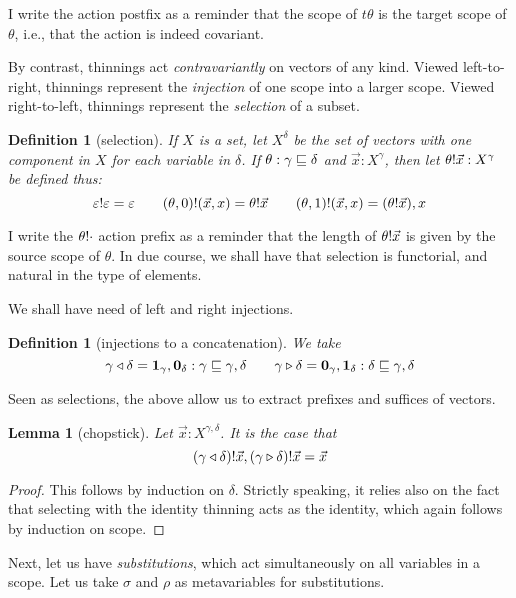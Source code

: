 \documentclass{jfp1}
\newtheorem{lemma}[theorem]{Lemma}
\newtheorem{definition}[theorem]{Definition}
\newcommand{\emp}{\varepsilon}
\begin{document}
I write the action postfix as a reminder that the scope of $t\theta$
is the target scope of $\theta$, i.e., that the action is indeed covariant.

By contrast, thinnings act \emph{contravariantly} on vectors of any kind.
Viewed left-to-right, thinnings represent the \emph{injection} of one scope
into a larger scope. Viewed right-to-left, thinnings represent the
\emph{selection} of a subset.

\begin{definition}[selection]
  If $X$ is a set, let $X^\delta$ be the set of vectors with one
  component in $X$ for each variable in $\delta$. If
  $\theta:\gamma\sqsubseteq\delta$ and $\vec x:X^\gamma$,
  then let $\theta!\vec x : X^\gamma$ be defined thus:
  \[
    \sel\emp\emp=\emp \qquad
    \sel{(\theta,0)}{(\vec x,x)} = \sel\theta{\vec x} \qquad
    \sel{(\theta,1)}{(\vec x,x)} = (\sel\theta{\vec x}),x
  \]
\end{definition}

I write the $\theta!\cdot$ action prefix as a reminder that the
length of $\theta!\vec x$ is given by the source scope
of $\theta$. In due course, we shall have that selection is
functorial, and natural in the type of elements.

We shall have need of left and right injections.
\newcommand{\thinl}[2]{#1 \triangleleft #2}
\newcommand{\thinr}[2]{#1 \triangleright #2}
\begin{definition}[injections to a concatenation]
  We take
  \[
    \thinl\gamma\delta = \ith_\gamma,\eth_\delta :
    \gamma\thin\gamma,\delta \qquad
    \thinr\gamma\delta = \eth_\gamma,\ith_\delta :
    \delta\thin\gamma,\delta
    \]
\end{definition}

Seen as selections, the above allow us to extract prefixes and
suffices of vectors.
\begin{lemma}[chopstick]
  Let $\vec x : X^{\gamma,\delta}$. It is the case that
\[
  \sel{(\thinl\gamma\delta)}{\vec x},
  \sel{(\thinr\gamma\delta)}{\vec x}
  = \vec x
\]
\end{lemma}
\begin{proof}
  This follows by induction on $\delta$. Strictly speaking, it relies
  also on the fact that selecting with the identity thinning acts as
  the identity, which again follows by induction on scope.
\end{proof}

Next, let us have \emph{substitutions}, which act simultaneously on all variables
in a scope. Let us take $\sigma$ and $\rho$ as metavariables for substitutions.
\end{document}
